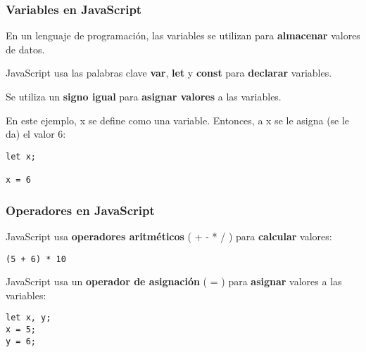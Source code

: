\begin{frame}[fragile]
  \frametitle{Variables en JavaScript}

  En un lenguaje de programación, las variables se utilizan
  para \textbf{almacenar} valores de datos.

  \vspace{\baselineskip}
  JavaScript usa las palabras clave \textbf{var}, \textbf{let} y
  \textbf{const} para \textbf{declarar} variables.

  \vspace{\baselineskip}
  Se utiliza un \textbf{signo igual} para \textbf{asignar valores}
  a las variables.

  \vspace{\baselineskip}
  En este ejemplo, x se define como una variable.
  Entonces, a x se le asigna (se le da) el valor 6:

  \vspace{\baselineskip}
  \begin{lstlisting}
let x;

x = 6
  \end{lstlisting}
\end{frame}


\begin{frame}[fragile]
  \frametitle{Operadores en JavaScript}

  JavaScript usa \textbf{operadores aritméticos} ( + - * / ) para
  \textbf{calcular} valores:

  \vspace{\baselineskip}
  \begin{lstlisting}
(5 + 6) * 10
  \end{lstlisting}

  \vspace{\baselineskip}
  JavaScript usa un \textbf{operador de asignación} ( = )
  para \textbf{asignar} valores a las variables:

  \vspace{\baselineskip}
  \begin{lstlisting}
let x, y;
x = 5;
y = 6;
  \end{lstlisting}
\end{frame}

